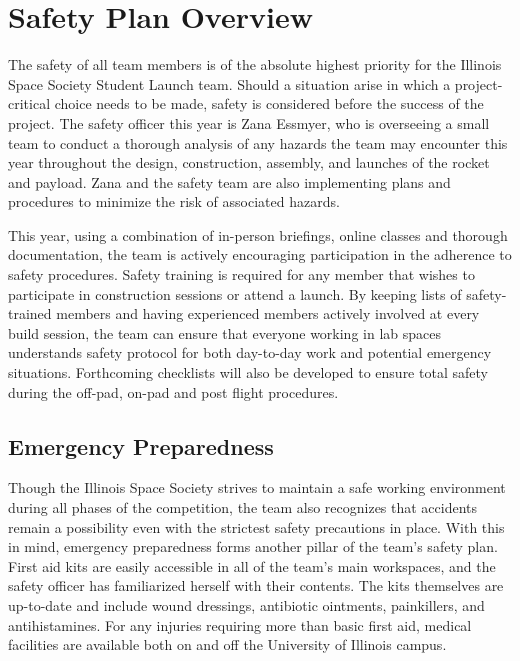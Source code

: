 \chapter{Safety Plan Overview}

The safety of all team members is of the absolute highest priority for the Illinois Space Society Student Launch team. Should a situation arise in which a project-critical choice needs to be made, safety is considered before the success of the project. The safety officer this year is Zana Essmyer, who is overseeing a small team to conduct a thorough analysis of any hazards the team may encounter this year throughout the design, construction, assembly, and launches of the rocket and payload. Zana and the safety team are also implementing plans and procedures to minimize the risk of associated hazards.

This year, using a combination of in-person briefings, online classes and thorough documentation, the team is actively encouraging participation in the adherence to safety procedures. Safety training is required for any member that wishes to participate in construction sessions or attend a launch. By keeping lists of safety-trained members and having experienced members actively involved at every build session, the team can ensure that everyone working in lab spaces understands safety protocol for both day-to-day work and potential emergency situations. Forthcoming checklists will also be developed to ensure total safety during the off-pad, on-pad and post flight procedures.

\section{Emergency Preparedness}

Though the Illinois Space Society strives to maintain a safe working environment during all phases of the competition, the team also recognizes that accidents remain a possibility even with the strictest safety precautions in place. With this in mind, emergency preparedness forms another pillar of the team's safety plan. First aid kits are easily accessible in all of the team's main workspaces, and the safety officer has familiarized herself with their contents. The kits themselves are up-to-date and include wound dressings, antibiotic ointments, painkillers, and antihistamines. For any injuries requiring more than basic first aid, medical facilities are available both on and off the University of Illinois campus.

